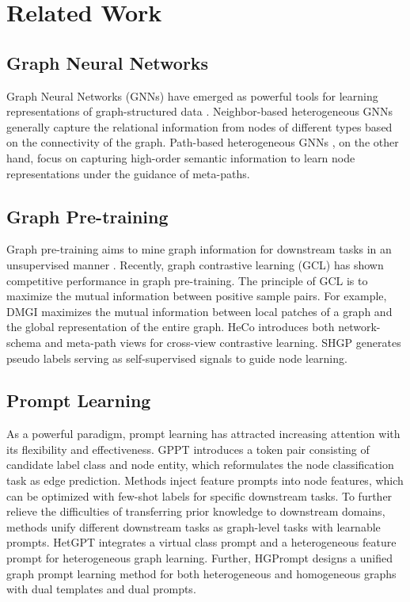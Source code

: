 \section{Related Work}
\subsection{Graph Neural Networks}

Graph Neural Networks (GNNs) have emerged as powerful tools for learning representations of graph-structured data \cite{GCN,GAT,nips24sun}. Neighbor-based heterogeneous GNNs \cite{RGCN,HetGNN} generally capture the relational information from nodes of different types based on the connectivity of the graph. Path-based heterogeneous GNNs \cite{GTN,HGT,HAN,MAGNN}, on the other hand, focus on capturing high-order semantic information to learn node representations under the guidance of meta-paths.

\vspace{-2mm}

\subsection{Graph Pre-training}

Graph pre-training aims to mine graph information for downstream tasks in an unsupervised manner \cite{www25sun}. Recently, graph contrastive learning (GCL) \cite{GraphCL,GCC,GCA,aaai22selfMG,aaai23sun} has shown competitive performance in graph pre-training. The principle of GCL is to maximize the mutual information between positive sample pairs. For example, DMGI \cite{DMGI} maximizes the mutual information between local patches of a graph and the global representation of the entire graph. HeCo \cite{HeCo} introduces both network-schema and meta-path views for cross-view contrastive learning. SHGP \cite{SHGP} generates pseudo labels serving as self-supervised signals to guide node learning.

\vspace{-2mm}

\subsection{Prompt Learning}

As a powerful paradigm, prompt learning has attracted increasing attention with its flexibility and effectiveness. GPPT \cite{GPPT} introduces a token pair consisting of candidate label class and node entity, which reformulates the node classification task as edge prediction. Methods \cite{GPF,VNT-GPPE} inject feature prompts into node features, which can be optimized with few-shot labels for specific downstream tasks. To further relieve the difficulties of transferring prior knowledge to downstream domains, methods \cite{All,GraphPrompt} unify different downstream tasks as graph-level tasks with learnable prompts. HetGPT \cite{HetGPT} integrates a virtual class prompt and a heterogeneous feature prompt for heterogeneous graph learning. Further, HGPrompt \cite{HGPrompt} designs a unified graph prompt learning method for both heterogeneous and homogeneous graphs with dual templates and dual prompts.